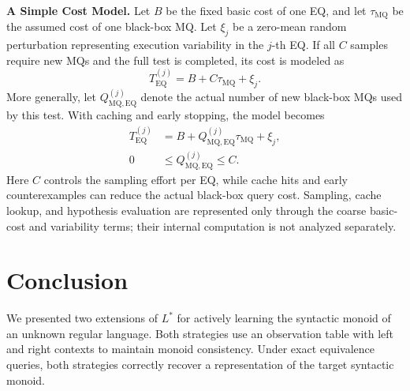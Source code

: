 \documentclass{ieice-tecrep}
\begin{document}
\textbf{A Simple Cost Model.}
Let \(B\) be the fixed basic cost of one EQ, and let
\(\tau_{\mathrm{MQ}}\) be the assumed cost of one black-box MQ.
Let \(\xi_j\) be a zero-mean random perturbation representing
execution variability in the \(j\)-th EQ. If all \(C\) samples
require new MQs and the full test is completed, its cost is modeled as
\[
T_{\mathrm{EQ}}^{(j)}=B+C\tau_{\mathrm{MQ}}+\xi_j.
\]
More generally, let \(Q_{\mathrm{MQ},\mathrm{EQ}}^{(j)}\) denote the
actual number of new black-box MQs used by this test. With caching
and early stopping, the model becomes
\[
\begin{aligned}
T_{\mathrm{EQ}}^{(j)}
&=B+Q_{\mathrm{MQ},\mathrm{EQ}}^{(j)}\tau_{\mathrm{MQ}}+\xi_j,\\
0&\le Q_{\mathrm{MQ},\mathrm{EQ}}^{(j)}\le C.
\end{aligned}
\]
Here \(C\) controls the sampling effort per EQ, while cache hits and
early counterexamples can reduce the actual black-box query cost.
Sampling, cache lookup, and hypothesis evaluation are represented
only through the coarse basic-cost and variability terms; their
internal computation is not analyzed separately.

\section{Conclusion}\label{conclusion}

We presented two extensions of \(L^*\) for actively learning the
syntactic monoid of an unknown regular language. Both strategies use
an observation table with left and right contexts to maintain monoid
consistency. Under exact equivalence queries, both strategies
correctly recover a representation of the target syntactic monoid.




\end{document}
